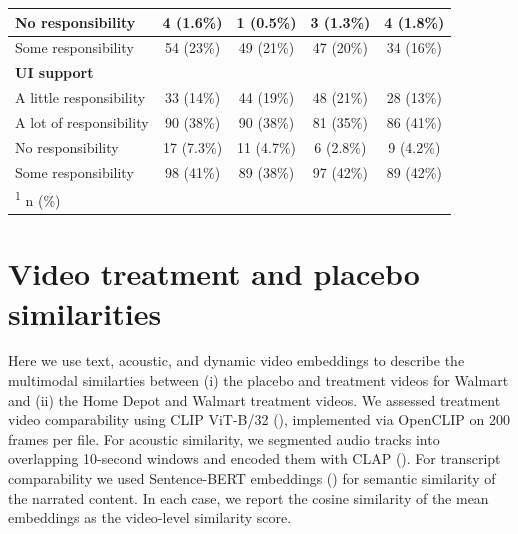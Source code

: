 \documentclass[
  11pt,
  oneside]{article}
\begin{document}
\begin{table}
\begin{tabular}[t]{l|c|c|c|c}
\hline
\hspace{1em}No responsibility & 4 (1.6\%) & 1 (0.5\%) & 3 (1.3\%) & 4 (1.8\%)\\
\hline
\hspace{1em}Some responsibility & 54 (23\%) & 49 (21\%) & 47 (20\%) & 34 (16\%)\\
\hline
\textbf{UI support} &  &  &  & \\
\hline
\hspace{1em}A little responsibility & 33 (14\%) & 44 (19\%) & 48 (21\%) & 28 (13\%)\\
\hline
\hspace{1em}A lot of responsibility & 90 (38\%) & 90 (38\%) & 81 (35\%) & 86 (41\%)\\
\hline
\hspace{1em}No responsibility & 17 (7.3\%) & 11 (4.7\%) & 6 (2.8\%) & 9 (4.2\%)\\
\hline
\hspace{1em}Some responsibility & 98 (41\%) & 89 (38\%) & 97 (42\%) & 89 (42\%)\\
\hline
\multicolumn{5}{l}{\rule{0pt}{1em}\textsuperscript{1} n (\%)}\\
\end{tabular}
\end{table}

\FloatBarrier
\newpage

\section{Video treatment and placebo similarities}\label{app-vidsim}

Here we use text, acoustic, and dynamic video embeddings to describe the multimodal similarties between (i) the placebo and treatment videos for Walmart and (ii) the Home Depot and Walmart treatment videos. We assessed treatment video comparability using CLIP ViT-B/32 (), implemented via OpenCLIP on 200 frames per file. For acoustic similarity, we segmented audio tracks into overlapping 10-second windows and encoded them with CLAP (). For transcript comparability we used Sentence-BERT embeddings () for semantic similarity of the narrated content. In each case, we report the cosine similarity of the mean embeddings as the video-level similarity score.
\end{document}
